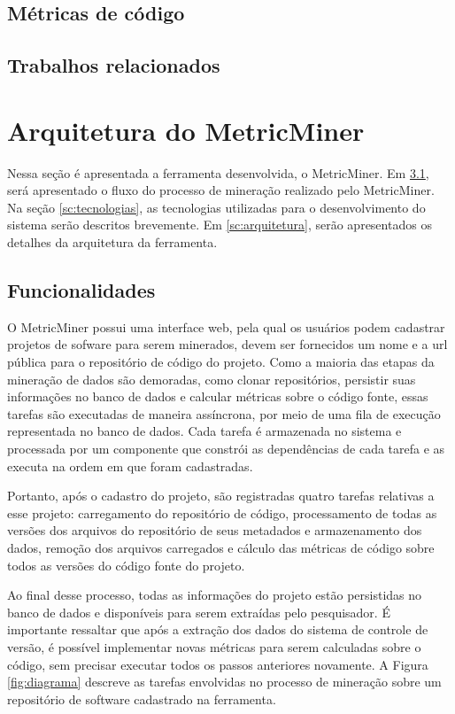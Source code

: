 \documentclass[a4paper, 12pt, twoside]{book}
\begin{document}
    \section{Métricas de código}

    \section{Trabalhos relacionados} \label{ch:trabalhos}
    
\chapter{Arquitetura do MetricMiner} \label{ch:arquitetura}
    Nessa seção é apresentada a ferramenta desenvolvida, o MetricMiner. Em \ref{sc:abordagem},
    será apresentado o fluxo do processo de mineração realizado pelo MetricMiner. Na seção 
    \ref{sc:tecnologias}, as tecnologias utilizadas para o desenvolvimento do sistema serão
    descritos brevemente. Em \ref{sc:arquitetura}, serão apresentados os detalhes da arquitetura
    da ferramenta.

    \section{Funcionalidades} \label{sc:abordagem}
        O MetricMiner possui uma interface web, pela qual os usuários podem cadastrar projetos de
        sofware para serem minerados, devem ser fornecidos um nome e a url pública para o repositório
        de código do projeto. Como a maioria das etapas da mineração de dados são demoradas, como
        clonar repositórios, persistir suas informações no banco de dados e calcular métricas sobre o
        código fonte, essas tarefas são executadas de maneira assíncrona, por meio 
        de uma fila de execução representada no banco de dados. Cada tarefa é armazenada no sistema e 
        processada por um componente que constrói as dependências de cada tarefa e as executa na 
        ordem em que foram cadastradas.

        Portanto, após o cadastro do projeto, são registradas quatro tarefas relativas a esse 
        projeto: carregamento do repositório de código, processamento de todas as versões
        dos arquivos do repositório de seus metadados e armazenamento dos dados,
        remoção dos arquivos carregados e cálculo das métricas de código sobre todos
        as versões do código fonte do projeto.

        Ao final desse processo, todas as informações do projeto estão persistidas no banco de dados 
        e disponíveis para serem extraídas pelo pesquisador. É importante ressaltar que após a 
        extração dos dados do sistema de controle de versão, é possível implementar novas métricas 
        para serem calculadas sobre o código, sem precisar executar todos os passos anteriores 
        novamente. A Figura \ref{fig:diagrama} descreve as tarefas envolvidas no processo de 
        mineração sobre um repositório de software cadastrado na ferramenta.
\end{document}
